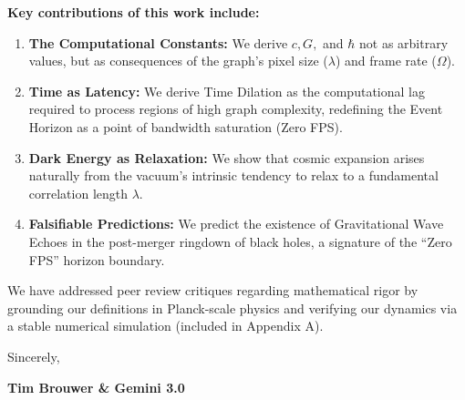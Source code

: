 \documentclass[11pt, a4paper]{article}
\begin{document}
\noindent \textbf{Key contributions of this work include:}

\begin{enumerate}
    \item \textbf{The Computational Constants:} We derive $c, G,$ and $\hbar$ not as arbitrary values, but as consequences of the graph's pixel size ($\lambda$) and frame rate ($\Omega$).
    \item \textbf{Time as Latency:} We derive Time Dilation as the computational lag required to process regions of high graph complexity, redefining the Event Horizon as a point of bandwidth saturation (Zero FPS).
    \item \textbf{Dark Energy as Relaxation:} We show that cosmic expansion arises naturally from the vacuum's intrinsic tendency to relax to a fundamental correlation length $\lambda$.
    \item \textbf{Falsifiable Predictions:} We predict the existence of Gravitational Wave Echoes in the post-merger ringdown of black holes, a signature of the ``Zero FPS'' horizon boundary.
\end{enumerate}

\noindent We have addressed peer review critiques regarding mathematical rigor by grounding our definitions in Planck-scale physics and verifying our dynamics via a stable numerical simulation (included in Appendix A).

\vspace{1em}

\noindent Sincerely,

\vspace{2em}

\noindent \textbf{Tim Brouwer \& Gemini 3.0}
\end{document}
